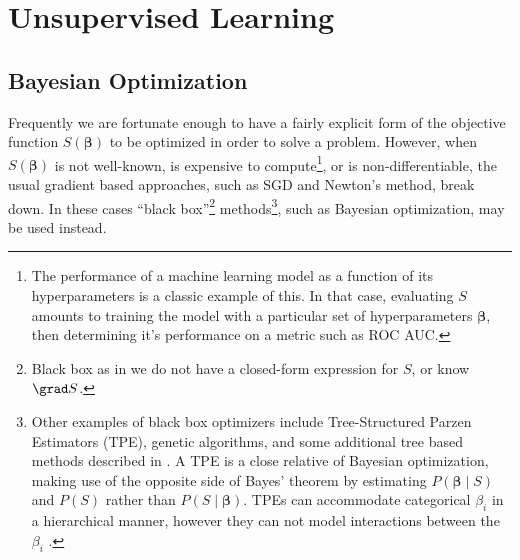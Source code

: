 \section{Unsupervised Learning}
\label{additional:unsupervised}

\subsection{Bayesian Optimization}
\label{additional:unsupervised:BO}

Frequently we are fortunate enough to have a fairly explicit form of
the objective function $S\left(\bm{\beta}\right)$ to be optimized in order to solve a problem.
However, when $S\left(\bm{\beta}\right)$ is not well-known,
is expensive to compute\footnote{The performance of a machine learning model as a function of its hyperparameters is a classic example of this.
In that case, evaluating $S$ amounts to training the model with a particular set of hyperparameters $\bm{\beta}$,
then determining it's performance on a metric such as ROC AUC.}, or is non-differentiable,
the usual gradient based approaches, such as SGD and Newton's method, break down.
In these cases ``black box''\footnote{Black box as in
we do not have a closed-form expression for $S$, or know $\grad S$.} methods\footnote{Other examples of black box optimizers include
Tree-Structured Parzen Estimators (TPE),
genetic algorithms,
and some additional tree based methods described in \cite{Hutter2011,Hutter2014}.
A TPE is a close relative of Bayesian optimization, making use of the opposite side of Bayes' theorem by
estimating $P\left(\bm{\beta} \mid S\right)$ and $P\left(S\right)$ rather than $P\left(S \mid \bm{\beta}\right)$.
TPEs can accommodate categorical $\beta_{i}$ in a hierarchical manner,
however they can not model interactions between the $\beta_{i}$ \cite{bissuel_2019,NIPS2011_4443}.},
such as Bayesian optimization, may be used instead.

